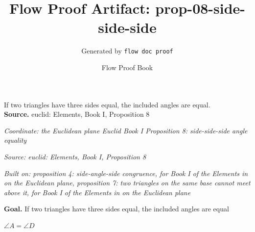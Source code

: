 \documentclass[11pt]{article}
\title{Flow Proof Artifact: prop-08-side-side-side}
\author{Generated by \texttt{flow doc proof}}
\date{Flow Proof Book}
\theoremstyle{definition}
\begin{document}
\maketitle
If two triangles have three sides equal, the included angles are equal.\\[0.5em]
\textbf{Source.} euclid: Elements, Book I, Proposition 8\\[0.5em]
\bigskip
{}\par
\smallskip\noindent\textit{Coordinate: the Euclidean plane \cdot Euclid Book I \cdot Proposition 8: side-side-side angle equality}\par
\smallskip\noindent\textit{Source: euclid: Elements, Book I, Proposition 8}\par
\smallskip\noindent\textit{Built on: proposition 4: side-angle-side congruence, for Book I of the Elements in on the Euclidean plane, proposition 7: two triangles on the same base cannot meet above it, for Book I of the Elements in on the Euclidean plane}\par
\medskip
\noindent\textbf{Goal.} If two triangles have three sides equal, the included angles are equal\par
\noindent$\displaystyle \angle A = \angle D$\par
\medskip
\noindent
\end{document}

